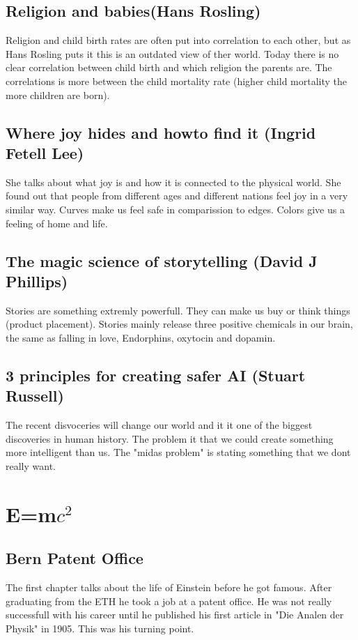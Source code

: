 \documentclass{article}
\begin{document}
\subsection{Religion and babies(Hans Rosling)}
Religion and child birth rates are often put into correlation to each other, but as Hans Rosling puts it this is an outdated view of ther world. Today there is no clear correlation between child birth and which religion the parents are. The correlations is more between the child mortality rate (higher child mortality the more children are born).
\subsection{Where joy hides and howto find it (Ingrid Fetell Lee)}
She talks about what joy is and how it is connected to the physical world. She found out that people from different ages and different nations feel joy in a very similar way. Curves make us feel safe in comparission to edges. Colors give us a feeling of home and life.
\subsection{The magic science of storytelling (David J Phillips)}
Stories are something extremly powerfull. They can make us buy or think things (product placement). Stories mainly release three positive chemicals in our brain, the same as falling in love, Endorphins, oxytocin and dopamin. 
\subsection{3 principles for creating safer AI (Stuart Russell)}
The recent disvoceries will change our world and it it one of the biggest discoveries in human history. The problem it that we could create something more intelligent than us. The "midas problem" is stating something that we dont really want.
\newpage
\section{E=m$c^2$}
\subsection{Bern Patent Office}
The first chapter talks about the life of Einstein before he got famous. After graduating from the ETH he took a job at a patent office. He was not really successfull with his career until he published his first article in "Die Analen der Physik" in 1905. This was his turning point.
\end{document}
